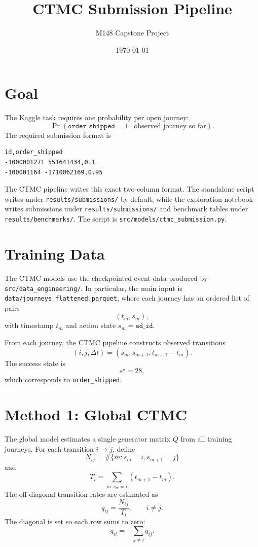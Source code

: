 \documentclass[11pt]{article}
\title{CTMC Submission Pipeline}
\author{M148 Capstone Project}
\date{\today}
\begin{document}
\maketitle

\section{Goal}

The Kaggle task requires one probability per open journey:
\[
\Pr(\texttt{order\_shipped}=1 \mid \text{observed journey so far}).
\]
The required submission format is
\begin{verbatim}
id,order_shipped
-1000001271 551641434,0.1
-100001164 -1710062169,0.95
\end{verbatim}

The CTMC pipeline writes this exact two-column format.  The standalone script
writes under \texttt{results/submissions/} by default, while the exploration
notebook writes submissions under \texttt{results/submissions/} and benchmark
tables under \texttt{results/benchmarks/}.  The script is
\texttt{src/models/ctmc\_submission.py}.

\section{Training Data}

The CTMC models use the checkpointed event data produced by
\texttt{src/data\_engineering/}.  In particular, the main input is
\texttt{data/journeys\_flattened.parquet}, where each journey has an ordered
list of pairs
\[
(t_m, s_m),
\]
with timestamp \(t_m\) and action state \(s_m=\texttt{ed\_id}\).

From each journey, the CTMC pipeline constructs observed transitions
\[
(i,j,\Delta t)=(s_m,s_{m+1},t_{m+1}-t_m).
\]
The success state is
\[
s^\star = 28,
\]
which corresponds to \texttt{order\_shipped}.

\section{Method 1: Global CTMC}

The global model estimates a single generator matrix \(Q\) from all training
journeys.  For each transition \(i\to j\), define
\[
N_{ij}=\#\{m:s_m=i, s_{m+1}=j\}
\]
and
\[
T_i=\sum_{m:s_m=i}(t_{m+1}-t_m).
\]
The off-diagonal transition rates are estimated as
\[
q_{ij}=\frac{N_{ij}}{T_i}, \qquad i\neq j.
\]
The diagonal is set so each row sums to zero:
\[
q_{ii}=-\sum_{j\neq i}q_{ij}.
\]
\end{document}
